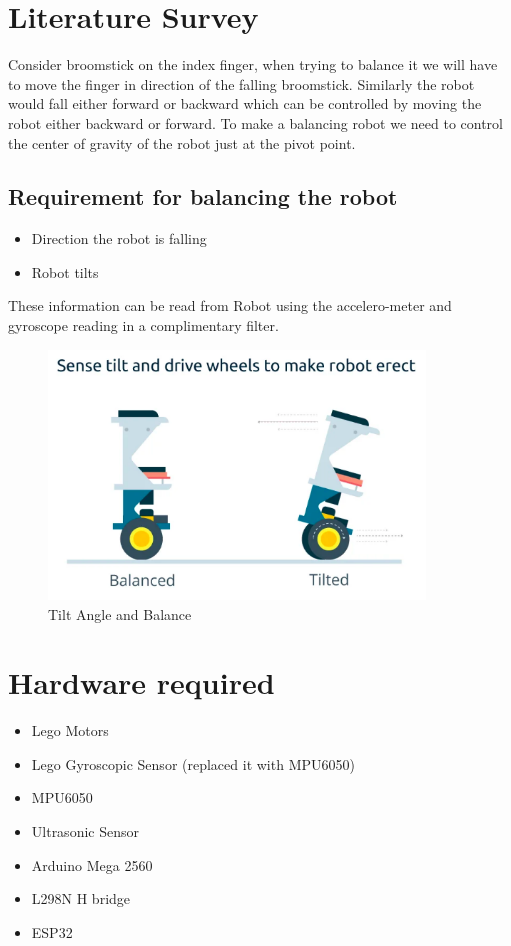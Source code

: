\documentclass{article}
\begin{document}
	\section{Literature Survey}
	Consider broomstick on the index finger, when trying to balance it we will have to move the finger in direction of the falling broomstick. Similarly the robot would fall either forward or backward which can be controlled by moving the robot either backward or forward.
	To make a balancing robot we need to control the center of gravity of the robot just at the pivot point. 
	\subsection{Requirement for balancing the robot}	
	\begin{itemize}
		\item Direction the robot is falling 
		\item Robot tilts
	\end{itemize}	
	These information can be read from Robot using the accelero-meter and gyroscope reading in a complimentary filter.
	
	
	\begin{figure}[h]
		\centering
		\includegraphics[width=100mm,scale=0.5]{balance.png}
		\caption{Tilt Angle and Balance}
		\label{Tilt Angle and Balance}
	\end{figure}

\pagebreak
	\section{Hardware required}
	 \begin{itemize}
	 	\item Lego Motors   
	 	\item Lego Gyroscopic Sensor  (replaced it with MPU6050)
	 	\item MPU6050
	 	\item Ultrasonic Sensor
	 	\item Arduino Mega 2560
	 	\item L298N H bridge
	 	\item ESP32
	 \end{itemize}
 	
\end{document}

